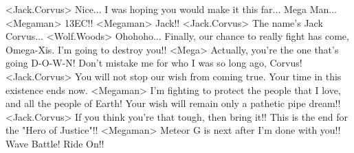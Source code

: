 <Jack.Corvus> Nice... I was hoping you would make it this far... Mega Man... 
<Megaman> {13}{EC}!! 
<Megaman> Jack!! 
<Jack.Corvus> The name's Jack Corvus... 
<Wolf.Woods> Ohohoho... Finally, our chance to really fight has come, Omega-Xis. 
I'm going to destroy you!! 
<Mega> Actually, you're the one that's going D-O-W-N! 
Don't mistake me for who I was so long ago, Corvus! 
<Jack.Corvus> You will not stop our wish from coming true. 
Your time in this existence ends now. 
<Megaman> I'm fighting to protect the people that I love, and all the people of Earth! 
Your wish will remain only a pathetic pipe dream!! 
<Jack.Corvus> If you think you're that tough, then bring it!! 
This is the end for the "Hero of Justice"!! 
<Megaman> Meteor G is next after I'm done with you!! 
Wave Battle! Ride On!! 
